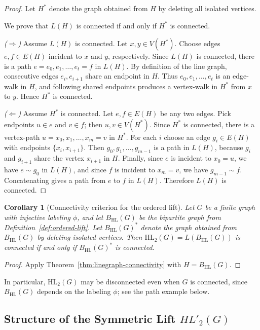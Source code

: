 \documentclass[11pt]{article}
\newtheorem{corollary}{Corollary}
\newcommand{\HL}{\mathrm{HL}}
\theoremstyle{plain}
\begin{document}
\begin{proof}
Let $H^\ast$ denote the graph obtained from $H$ by deleting all isolated vertices.

We prove that $L(H)$ is connected if and only if $H^\ast$ is connected.

\smallskip
\noindent\emph{($\Rightarrow$)} Assume $L(H)$ is connected. Let $x,y\in V(H^\ast)$.
Choose edges $e,f\in E(H)$ incident to $x$ and $y$, respectively. Since $L(H)$ is connected,
there is a path $e=e_0,e_1,\dots,e_t=f$ in $L(H)$. By definition of the line graph, consecutive
edges $e_i,e_{i+1}$ share an endpoint in $H$. Thus $e_0,e_1,\dots,e_t$ is an edge-walk in $H$,
and following shared endpoints produces a vertex-walk in $H^\ast$ from $x$ to $y$. Hence
$H^\ast$ is connected.

\smallskip
\noindent\emph{($\Leftarrow$)} Assume $H^\ast$ is connected. Let $e,f\in E(H)$ be any two edges.
Pick endpoints $u\in e$ and $v\in f$; then $u,v\in V(H^\ast)$. Since $H^\ast$ is connected,
there is a vertex-path $u=x_0,x_1,\dots,x_m=v$ in $H^\ast$. For each $i$ choose an edge
$g_i\in E(H)$ with endpoints $\{x_i,x_{i+1}\}$. Then $g_0,g_1,\dots,g_{m-1}$ is a path in
$L(H)$, because $g_i$ and $g_{i+1}$ share the vertex $x_{i+1}$ in $H$. Finally, since $e$ is
incident to $x_0=u$, we have $e\sim g_0$ in $L(H)$, and since $f$ is incident to $x_m=v$, we
have $g_{m-1}\sim f$. Concatenating gives a path from $e$ to $f$ in $L(H)$. Therefore
$L(H)$ is connected.
\end{proof}

\begin{corollary}[Connectivity criterion for the ordered lift]\label{cor:HL2-connectivity}
Let $G$ be a finite graph with injective labeling $\phi$, and let $B_{\HL}(G)$ be the bipartite
graph from Definition~\ref{def:ordered-lift}. Let $B_{\HL}(G)^\ast$ denote the graph obtained from
$B_{\HL}(G)$ by deleting isolated vertices. Then $\HL_2(G)=L(B_{\HL}(G))$ is connected if and only if
$B_{\HL}(G)^\ast$ is connected.
\end{corollary}

\begin{proof}
Apply Theorem~\ref{thm:linegraph-connectivity} with \(H=B_{\HL}(G)\).
\end{proof}

In particular, $\HL_2(G)$ may be disconnected even when $G$ is connected, since
$B_{\HL}(G)$ depends on the labeling $\phi$; see the path example below.


\subsection{Structure of the Symmetric Lift {${HL}'_2(G)$}}
\end{document}
